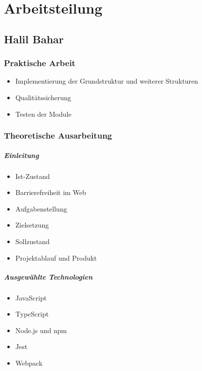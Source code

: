 \chapter{Arbeitsteilung}

\section{Halil Bahar}

\subsection{Praktische Arbeit}

\begin{itemize}
	\item Implementierung der Grundstruktur und weiterer Strukturen
	\item Qualitätssicherung
	\item Testen der Module
\end{itemize}

\subsection{Theoretische Ausarbeitung}

\paragraph{Einleitung}

\begin{itemize}
	\item Ist-Zustand
	\item Barrierefreiheit im Web
	\item Aufgabenstellung
	\item Zielsetzung
	\item Sollzustand
	\item Projektablauf und Produkt
\end{itemize}

\paragraph{Ausgewählte Technologien}

\begin{itemize}
	\item JavaScript
	\item TypeScript
	\item Node.js und npm
	\item Jest
	\item Webpack
\end{itemize}

